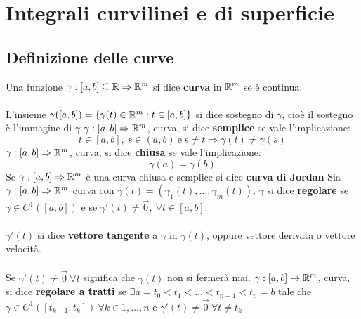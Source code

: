 \chapter{Integrali curvilinei e di superficie}
	\section{Definizione delle curve}
	Una funzione $\gamma : [ a, b ] \subseteq \mathbb{R} \Rightarrow \mathbb{R}^m$ si dice \textbf{curva} in $\mathbb{R}^m$ se è continua.\\
	\\
	L'insieme $\gamma ([a,b])= \{\gamma(t)\in \mathbb{R}^m : t \in [a,b] \}$ si dice sostegno di $\gamma$, cioè il sostegno è l'immagine di $\gamma$
	$\gamma:[a,b]\Rightarrow \mathbb{R}^m$, curva, si dice \textbf{semplice} se vale l'implicazione:
	$$t \in [a, b],\ s \in (a, b)\ \text{e} \ s\ne t \Rightarrow \gamma(t)\ne \gamma(s)$$
	$\gamma:[a,b]\Rightarrow \mathbb{R}^m$, curva, si dice \textbf{chiusa} se vale l'implicazione:
	$$\gamma(a)=\gamma(b)$$
	Se $\gamma:[a,b]\Rightarrow \mathbb{R}^m$ è una curva chiusa e semplice si dice \textbf{curva di Jordan}
	Sia $\gamma : [a, b] \Rightarrow \mathbb{R}^m$ curva con $\gamma(t) = (\gamma_1(t),\dots, \gamma_m(t))$, $\gamma$ si dice \textbf{regolare} se $\gamma \in C^1([a, b])$ e se $\gamma'(t)\ne \vec{0}, \ \forall t \in [a, b]$.\\
	\\
	$\gamma'(t)$ si dice \textbf{vettore tangente} a $\gamma$ in $\gamma(t)$, oppure vettore derivata o vettore velocità.\\
	\\
	Se $\gamma'(t)\ne \vec 0 \  \forall t$ significa che $\gamma(t)$ non si fermerà mai.
	$\gamma:[a,b]\rightarrow \mathbb{R}^m$, curva, si dice \textbf{regolare a tratti} se $\exists a=t_0<t_1<\dots<t_{n-1}<t_{n}=b$ tale che $\gamma \in C^1([t_{k-1}, t_k]) \ \forall k \in {1, \dots, n}$ e $\gamma'(t)\ne \vec 0 \ \forall t \ne t_k$
